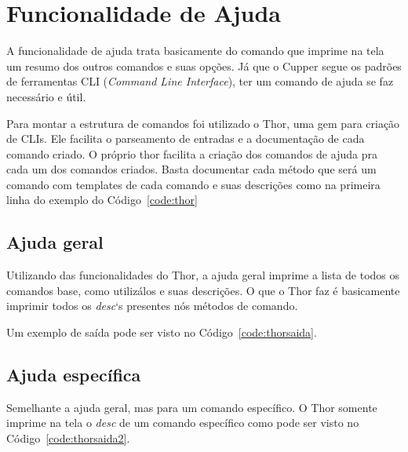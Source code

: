 \section{Funcionalidade de Ajuda}
\label{sec:help}

A funcionalidade de ajuda trata basicamente do comando que imprime na tela um resumo
dos outros comandos e suas opções. Já que o Cupper segue os padrões de ferramentas
CLI (\textit{Command Line Interface}), ter um comando de ajuda se faz necessário
e útil.

Para montar a estrutura de comandos foi utilizado o Thor, uma gem para criação
de CLIs. Ele facilita o parseamento de entradas e a documentação de cada comando criado.
O próprio thor facilita a criação dos comandos de ajuda pra cada um dos comandos
criados. Basta documentar cada método que será um comando com templates de cada
comando e suas descrições como na primeira linha do exemplo do Código~\ref{code:thor}

\noindent\begin{minipage}{\textwidth}
  
\end{minipage}\hfill

\subsection{Ajuda geral}
Utilizando das funcionalidades do Thor, a ajuda geral imprime a lista de todos
os comandos base, como utilizálos e suas descrições. O que o Thor faz é basicamente
imprimir todos os \textit{desc}`s presentes nós métodos de comando.

Um exemplo de saída pode ser visto no Código~\ref{code:thorsaida}.

\noindent\begin{minipage}{\textwidth}
  
\end{minipage}\hfill


\subsection{Ajuda específica}
Semelhante a ajuda geral, mas para um comando específico. O Thor somente imprime
na tela o \textit{desc} de um comando específico como pode ser visto no Código~\ref{code:thorsaida2}.

\noindent\begin{minipage}{\textwidth}
  
\end{minipage}\hfill

